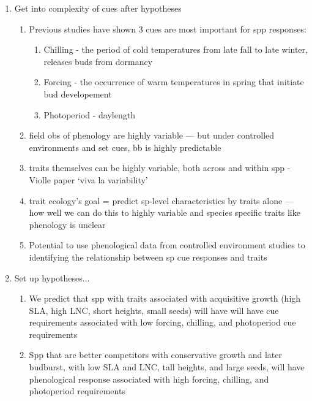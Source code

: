 \documentclass{article}
\begin{document}
\begin{enumerate}
\item Get into complexity of cues after hypotheses %
\begin{enumerate}
\item Previous studies have shown 3 cues are most important for spp responses:
\begin{enumerate}
\item Chilling - the period of cold temperatures from late fall to late winter, releases buds from dormancy
\item Forcing - the occurrence of warm temperatures in spring that initiate bud developement 
\item Photoperiod - daylength
\end{enumerate}
\item field obs of phenology are highly variable — but under controlled environments and set cues, bb is highly predictable
\item traits themselves can be highly variable, both across and within spp - Violle paper ‘viva la variability’
\item trait ecology’s goal = predict sp-level characteristics by traits alone — how well we can do this to highly variable and species specific traits like phenology is unclear
\item Potential to use phenological data from controlled environment studies to identifying the relationship between sp cue responses and traits
\end{enumerate}

\item Set up hypotheses...
\begin{enumerate}
\item We predict that spp with traits associated with acquisitive growth (high SLA, high LNC, short heights, small seeds) will have will have cue requirements associated with low forcing, chilling, and photoperiod cue requirements
\item Spp that are better competitors with conservative growth and later budburst, with low SLA and LNC, tall heights, and large seeds, will have phenological response associated with high forcing, chilling, and photoperiod requirements
\end{enumerate}


\end{enumerate}
\end{document}
